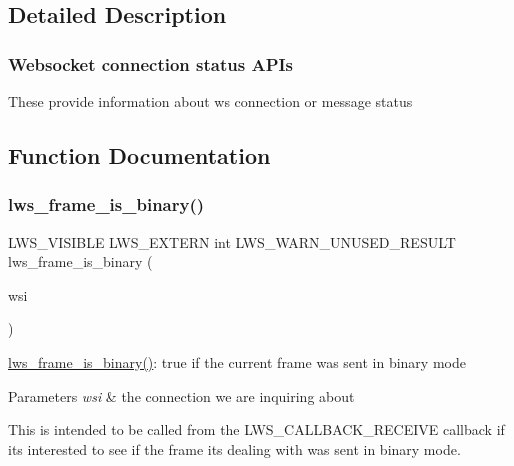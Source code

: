 \subsection{Detailed Description}
\subsubsection*{Websocket connection status A\+P\+Is}

These provide information about ws connection or message status 

\subsection{Function Documentation}
\mbox{\label{group__wsstatus_gaccd9c59336efad8af0554f79cc5966fd}} 
\subsubsection{\texorpdfstring{lws\+\_\+frame\+\_\+is\+\_\+binary()}{lws\_frame\_is\_binary()}}
{\footnotesize\ttfamily L\+W\+S\+\_\+\+V\+I\+S\+I\+B\+LE L\+W\+S\+\_\+\+E\+X\+T\+E\+RN int L\+W\+S\+\_\+\+W\+A\+R\+N\+\_\+\+U\+N\+U\+S\+E\+D\+\_\+\+R\+E\+S\+U\+LT lws\+\_\+frame\+\_\+is\+\_\+binary (\begin{DoxyParamCaption}\item[{struct \hyperlink{structlws}{lws} $\ast$}]{wsi }\end{DoxyParamCaption})}

\hyperlink{group__wsstatus_gaccd9c59336efad8af0554f79cc5966fd}{lws\+\_\+frame\+\_\+is\+\_\+binary()}\+: true if the current frame was sent in binary mode


\begin{DoxyParams}{Parameters}
{\em wsi} & the connection we are inquiring about\\
\hline
\end{DoxyParams}
This is intended to be called from the L\+W\+S\+\_\+\+C\+A\+L\+L\+B\+A\+C\+K\+\_\+\+R\+E\+C\+E\+I\+VE callback if it\textquotesingle{}s interested to see if the frame it\textquotesingle{}s dealing with was sent in binary mode. \mbox{\label{group__wsstatus_ga3df5045656dfb6b0e63a38de2dca79d2}} 
